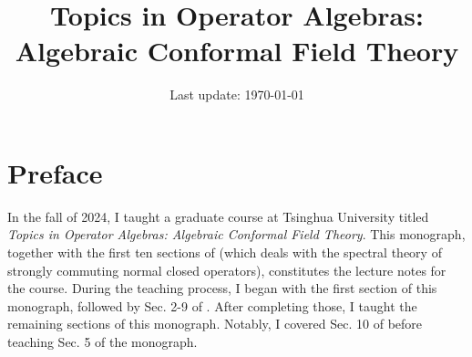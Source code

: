 \documentclass[12pt,b5paper,notitlepage]{article}
\title{Topics in Operator Algebras: Algebraic Conformal Field Theory}
\author{\sc{ Bin Gui}
}
\date{\normalsize Last update: \today}
\theoremstyle{definition}
\theoremstyle{plain}
\numberwithin{equation}{section}
\begin{document}
\sloppy %
	\setcounter{page}{1}
	\setcounter{section}{-1}



	









	
	\maketitle












	


\normalsize


\tableofcontents


\newpage

\section*{Preface}

In the fall of 2024, I taught a graduate course at Tsinghua University titled \textit{Topics in Operator Algebras: Algebraic Conformal Field Theory}. This monograph, together with the first ten sections of \cite{Gui-S} (which deals with the spectral theory of strongly commuting normal closed operators), constitutes the lecture notes for the course.  During the teaching process, I began with the first section of this monograph, followed by Sec. 2-9 of \cite{Gui-S}. After completing those, I taught the remaining sections of this monograph. Notably, I covered Sec. 10 of \cite{Gui-S} before teaching Sec. 5 of the monograph.
\end{document}
